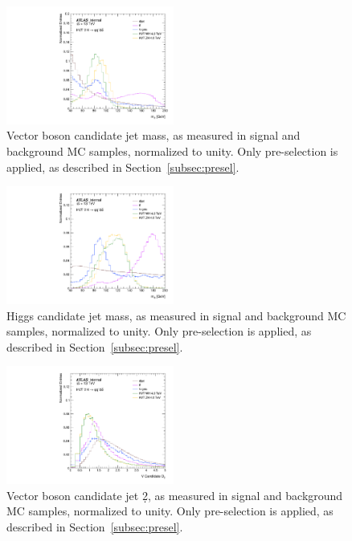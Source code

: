 \begin{figure}[htbp!]
\begin{center}
    \includegraphics[width=0.49\textwidth]{VHqqbb_SimpleSigBkgMC_mV.pdf}
\end{center}
\caption{Vector boson candidate jet mass, as measured in signal and background MC samples, normalized to unity. Only pre-selection is applied, as described in Section~\ref{subsec:presel}.}
\label{fig:simple_mc_mV}
\end{figure}

\begin{figure}[htbp!]
\begin{center}
    \includegraphics[width=0.49\textwidth]{VHqqbb_SimpleSigBkgMC_mH.pdf}
\end{center}
\caption{Higgs candidate jet mass, as measured in signal and background MC samples, normalized to unity. Only pre-selection is applied, as described in Section~\ref{subsec:presel}. }
\label{fig:simple_mc_mH}
\end{figure}

\begin{figure}[htbp!]
\begin{center}
    \includegraphics[width=0.49\textwidth]{VHqqbb_SimpleSigBkgMC_d2V.pdf}
\end{center}
\caption{Vector boson candidate jet \d2, as measured in signal and background MC samples, normalized to unity. Only pre-selection is applied, as described in Section~\ref{subsec:presel}. }
\label{fig:simple_mc_d2V}
\end{figure}

